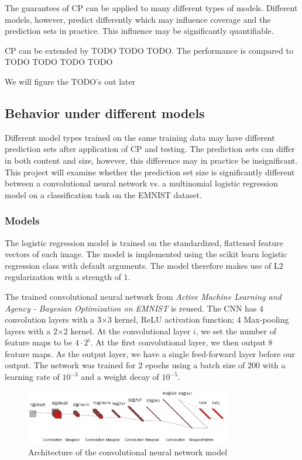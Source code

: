 The guarantees of CP can be applied to many different types of models. Different models, however, predict differently which may influence coverage and the prediction sets in practice. This influence may be significantly quantifiable.

CP can be extended by TODO TODO TODO. The performance is compared to TODO TODO TODO TODO

We will figure the TODO's out later

% 

\subsection{Behavior under different models}
Different model types trained on the same training data may have different prediction sets after application of CP and testing. The prediction sets can differ in both content and size, however, this difference may in practice be insignificant. This project will examine whether the prediction set size is significantly different between a convolutional neural network vs. a multinomial logistic regression model on a classification task on the EMNIST dataset.


\subsubsection{Models}
The logistic regression model is trained on the standardized, flattened feature vectors of each image. The model is implemented using the scikit learn logistic regression class with default arguments. The model therefore makes use of L2 regularization with a strength of $1$.

The trained convolutional neural network from \textit{Active Machine Learning and Agency - Bayesian Optimization on EMNIST} is reused. The CNN has $4$ convolution layers with a $3$×$3$
kernel, ReLU activation function; $4$ Max-pooling layers with a $2$×$2$ kernel. At the convolutional layer $i$, we set the number of feature maps to be $4 \cdot 2^i$. At the first convolutional layer, we then output $8$ feature maps. As the output layer, we have a single feed-forward layer before our output. The network was trained for $2$ epochs using a batch size of $200$ with a learning rate of $10^{-3}$ and a weight decay of $10^{-5}$. 

\begin{figure}
    \centering
    \includegraphics[width=0.8\textwidth]{Images/CNN_arch.png}
    \caption{Architecture of the convolutional neural network model}
\end{figure}


